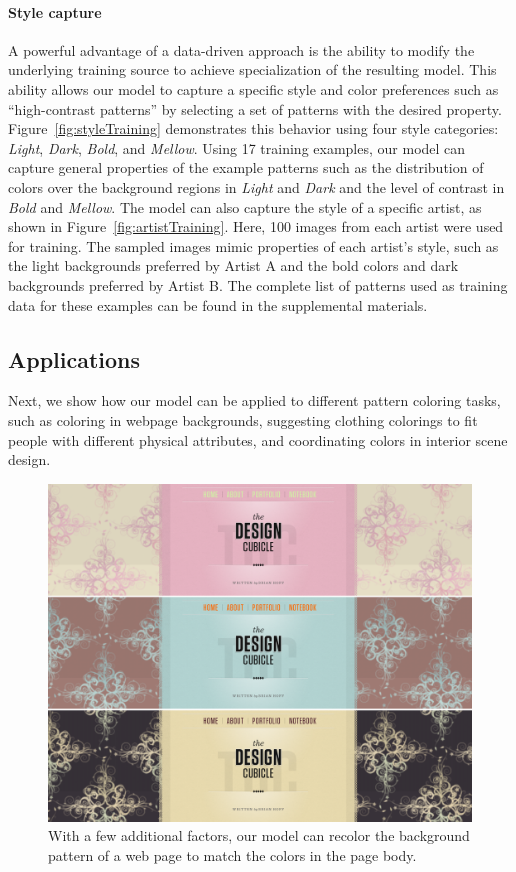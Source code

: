 \paragraph{Style capture} A powerful advantage of a data-driven approach is the ability to modify the underlying training source to achieve specialization of the resulting model. This ability allows our model to capture a specific style and color preferences such as ``high-contrast patterns'' by selecting a set of patterns with the desired property. Figure~\ref{fig:styleTraining} demonstrates this behavior using four style categories: \emph{Light}, \emph{Dark}, \emph{Bold}, and \emph{Mellow}. Using 17 training examples, our model can capture general properties of the example patterns such as the distribution of colors over the background regions in \emph{Light} and \emph{Dark} and the level of contrast in \emph{Bold} and \emph{Mellow}. The model can also capture the style of a specific artist, as shown in Figure~\ref{fig:artistTraining}. Here, 100 images from each artist were used for training. The sampled images mimic properties of each artist's style, such as the light backgrounds preferred by Artist A and the bold colors and dark backgrounds preferred by Artist B. The complete list of patterns used as training data for these examples can be found in the supplemental materials.

\subsection{Applications}

Next, we show how our model can be applied to different pattern coloring tasks, such as coloring in webpage backgrounds, suggesting clothing colorings to fit people with different physical attributes, and coordinating colors in interior scene design.

\begin{figure}[ht]
\centering
\includegraphics[width=\columnwidth]{figs/webpageRecoloring}
\caption{With a few additional factors, our model can recolor the background pattern of a web page to match the colors in the page body.}
\label{fig:webpageRecoloring}
\vspace{-1.0em}
\end{figure}


